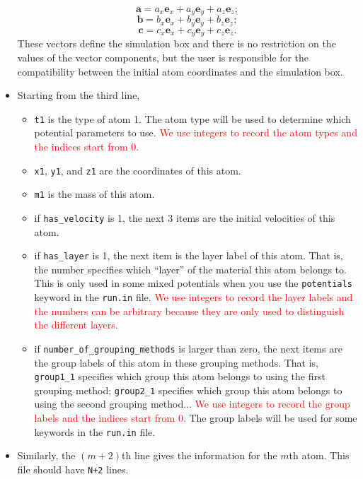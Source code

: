 \documentclass[12pt,a4paper]{report}
\newcommand{\vect}[1]{\boldsymbol{#1}}
\begin{document}
\begin{itemize}
\begin{equation}
\vect{a} = a_x \vect{e}_x + a_y \vect{e}_y + a_z \vect{e}_z;
\end{equation}
\begin{equation}
\vect{b} = b_x \vect{e}_x + b_y \vect{e}_y + b_z \vect{e}_z;
\end{equation}
\begin{equation}
\vect{c} = c_x \vect{e}_x + c_y \vect{e}_y + c_z \vect{e}_z.
\end{equation}
These vectors define the simulation box and there is no restriction on the values of the vector components, but the user is responsible for the compatibility between the initial atom coordinates and the simulation box.
\item Starting from the third line, 
\begin{itemize}
\item \verb"t1" is the type of atom 1. The atom type will be used to determine which potential parameters to use. \textcolor{red}{We use integers to record the atom types and the indices start from 0.}
\item \verb"x1", \verb"y1", and \verb"z1" are the coordinates of this atom.
\item  \verb"m1" is the mass of this atom.
\item if  \verb"has_velocity" is 1, the next 3 items are the initial velocities of this atom.
\item if \verb"has_layer" is 1, the next item is the layer label of this atom. That is, the number specifies which ``layer'' of the material this atom belongs to. This is only used in some mixed potentials when you use the \verb"potentials" keyword in the \verb"run.in" file.  \textcolor{red}{We use integers to record the layer labels and the numbers can be arbitrary because they are only used to distinguish the different layers.}
\item if \verb"number_of_grouping_methods" is larger than zero, the next items are the group labels of this atom in these grouping methods. That is, \verb"group1_1" specifies which group this atom belongs to using the first grouping method; \verb"group2_1" specifies which group this atom belongs to using the second grouping method... \textcolor{red}{We use integers to record the group labels and the indices start from 0.} The group labels will be used for some keywords in the \verb"run.in" file. 
\end{itemize}
\item Similarly, the $(m+2)$th line gives the information for the $m$th atom. This file should have \verb"N+2" lines.
\end{itemize}
\end{document}
